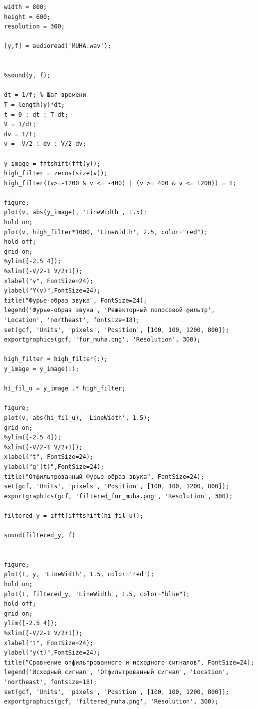 \documentclass[a4paper, 12pt]{article}
\begin{document}
\begin{lstlisting}[caption={Код для фильтрации звукового сигнала}]
width = 800;
height = 600;
resolution = 300;

[y,f] = audioread('MUHA.wav');


%sound(y, f);

dt = 1/f; % Шаг времени
T = length(y)*dt; 
t = 0 : dt : T-dt; 
V = 1/dt;
dv = 1/T;
v = -V/2 : dv : V/2-dv;

y_image = fftshift(fft(y));
high_filter = zeros(size(v));
high_filter((v>=-1200 & v <= -400) | (v >= 400 & v <= 1200)) = 1;

figure;
plot(v, abs(y_image), 'LineWidth', 1.5);
hold on;
plot(v, high_filter*1000, 'LineWidth', 2.5, color="red");
hold off;
grid on;
%ylim([-2.5 4]);
%xlim([-V/2-1 V/2+1]);
xlabel("v", FontSize=24);
ylabel("Y(v)",FontSize=24);
title("Фурье-образ звука", FontSize=24);
legend('Фурье-образ звука', 'Режекторный полосовой фильтр', 'Location', 'northeast', fontsize=18);
set(gcf, 'Units', 'pixels', 'Position', [100, 100, 1200, 800]);
exportgraphics(gcf, 'fur_muha.png', 'Resolution', 300);

high_filter = high_filter(:);
y_image = y_image(:);

hi_fil_u = y_image .* high_filter;

figure;
plot(v, abs(hi_fil_u), 'LineWidth', 1.5);
grid on;
%ylim([-2.5 4]);
%xlim([-V/2-1 V/2+1]);
xlabel("t", FontSize=24);
ylabel("g'(t)",FontSize=24);
title("Отфильтрованный Фурье-образ звука", FontSize=24);
set(gcf, 'Units', 'pixels', 'Position', [100, 100, 1200, 800]);
exportgraphics(gcf, 'filtered_fur_muha.png', 'Resolution', 300);

filtered_y = ifft(ifftshift(hi_fil_u));

sound(filtered_y, f)


figure;
plot(t, y, 'LineWidth', 1.5, color='red');
hold on;
plot(t, filtered_y, 'LineWidth', 1.5, color="blue");
hold off;
grid on;
ylim([-2.5 4]);
%xlim([-V/2-1 V/2+1]);
xlabel("t", FontSize=24);
ylabel("y(t)",FontSize=24);
title("Сравнение отфильтрованного и исходного сигналов", FontSize=24);
legend('Исходный сигнал', 'Отфильтрованный сигнал', 'Location', 'northeast', fontsize=18);
set(gcf, 'Units', 'pixels', 'Position', [100, 100, 1200, 800]);
exportgraphics(gcf, 'filtered_muha.png', 'Resolution', 300);
\end{lstlisting}
\end{document}
